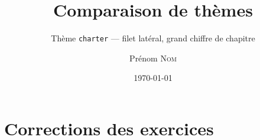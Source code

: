 \documentclass[11pt]{ocots-book}
\title{Comparaison de thèmes}
\subtitle{Thème \texttt{charter} --- filet latéral, grand chiffre de chapitre}
\author{Prénom \textsc{Nom}}
\date{\today}
\begin{document}
\maketitle

\ocotscollectsolutions%





\chapter{Corrections des exercices}
\ocotsprintsolutions%



\end{document}
